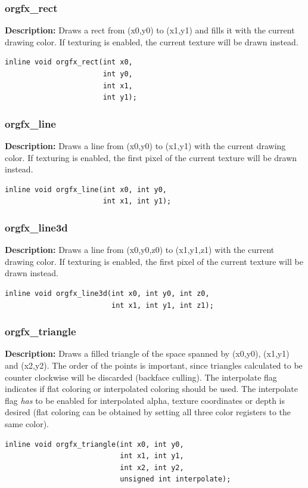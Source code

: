 \documentclass[10pt,a4paper]{article}
\begin{document}
\subsubsection{orgfx\_rect}
\textbf{Description:} Draws a rect from (x0,y0) to (x1,y1) and fills it with the current drawing color. If texturing is enabled, the current texture will be drawn instead.
\begin{lstlisting}
inline void orgfx_rect(int x0, 
                       int y0, 
                       int x1, 
                       int y1);
\end{lstlisting}

\subsubsection{orgfx\_line}
\textbf{Description:} Draws a line from (x0,y0) to (x1,y1) with the current drawing color. If texturing is enabled, the first pixel of the current texture will be drawn instead.
\begin{lstlisting}
inline void orgfx_line(int x0, int y0, 
                       int x1, int y1);
\end{lstlisting}

\subsubsection{orgfx\_line3d}
\textbf{Description:} Draws a line from (x0,y0,z0) to (x1,y1,z1) with the current drawing color. If texturing is enabled, the first pixel of the current texture will be drawn instead.
\begin{lstlisting}
inline void orgfx_line3d(int x0, int y0, int z0,
                         int x1, int y1, int z1);
\end{lstlisting}

\subsubsection{orgfx\_triangle}
\textbf{Description:} Draws a filled triangle of the space spanned by (x0,y0), (x1,y1) and (x2,y2). The order of the points is important, since triangles calculated to be counter clockwise will be discarded (backface culling). The interpolate flag indicates if flat coloring or interpolated coloring should be used. The interpolate flag \textit{has} to be enabled for interpolated alpha, texture coordinates or depth is desired (flat coloring can be obtained by setting all three color registers to the same color).
\begin{lstlisting}
inline void orgfx_triangle(int x0, int y0, 
                           int x1, int y1, 
                           int x2, int y2,
                           unsigned int interpolate);
\end{lstlisting}
\end{document}
